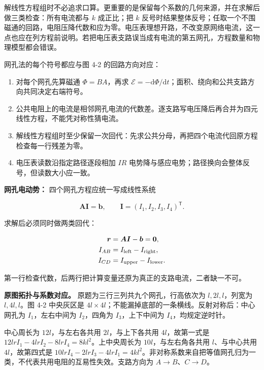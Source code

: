 \documentclass[12pt,a4paper,UTF8]{ctexart}
\newcommand{\tightlist}{\setlength{\itemsep}{0pt}\setlength{\parskip}{0pt}}
\begin{document}
解线性方程组时不必追求口算。更重要的是保留每个系数的几何来源，并在求解后做三类检查：所有电流都与
\(k\) 成正比；把 \(k\)
反号时结果整体反号；任取一个不围磁通的回路，电阻压降代数和应为零。电压表理想开路，不改变原网络电流，这一点也应在列方程前说明。若把电压表支路误当成有电流的第五网孔，方程数量和物理模型都会错误。

网孔法的每个符号都应与图 4-2 的回路方向对应：

\begin{enumerate}
\def\labelenumi{\arabic{enumi}.}
\tightlist
\item
  对每个网孔先算磁通 \(\Phi=BA\)，再求
  \(\mathcal E=-\mathrm d\Phi/\mathrm dt\)；面积、绕向和公共支路方向共同决定右端符号。
\item
  公共电阻上的电流是相邻网孔电流的代数差。逐支路写电压降后再合并为四元线性方程，不能凭对称性猜电流。
\item
  解线性方程组时至少保留一次回代：先求公共分母，再把四个电流代回原方程检查每一行残差为零。
\item
  电压表读数沿指定路径逐段相加 \(IR\)
  电势降与感应电势；路径换向会整体反号，但读数大小应一致。
\end{enumerate}

\textbf{网孔电动势：} 四个网孔方程应统一写成线性系统

\[\boldsymbol A\boldsymbol I=\boldsymbol b,\qquad
\boldsymbol I=(I_1,I_2,I_3,I_4)^{\mathsf T}.\]

求解后必须同时做两类回代：

\[\begin{aligned}
\boldsymbol r&=\boldsymbol A\boldsymbol I-\boldsymbol b
=\boldsymbol0,\\
I_{AB}&=I_{\rm left}-I_{\rm right},\\
I_{CD}&=I_{\rm upper}-I_{\rm lower}.
\end{aligned}\]

第一行检查代数，后两行把计算变量还原为真正的支路电流，二者缺一不可。

\textbf{原图拓扑与系数对应。} 原题为三行三列共九个网孔，行高依次为
\(l,2l,l\)，列宽为 \(l,4l,l\)。图 4-2 中央灰区是
\(4l\times4l\)；不能漏掉底部的一条横线。反射对称后：中心网孔为
\(I_1\)，左右中间为 \(I_2\)，四角为 \(I_3\)，上下中间为
\(I_4\)，均规定逆时针。

中心周长为 \(12l\)，与左右各共用 \(2l\)，与上下各共用 \(4l\)，故第一式是
\(12lrI_1-4lrI_2-8lrI_4=8kl^2\)。上中央周长为 \(10l\)，与左右角各共用
\(l\)、与中心共用 \(4l\)，故第四式是
\(10lrI_4-2lrI_3-4lrI_1=4kl^2\)。非对称系数来自把等值网孔归为一类，不代表共用电阻的互易性失效。支路方向为
\(A\to B\)、\(C\to D\)。
\end{document}

